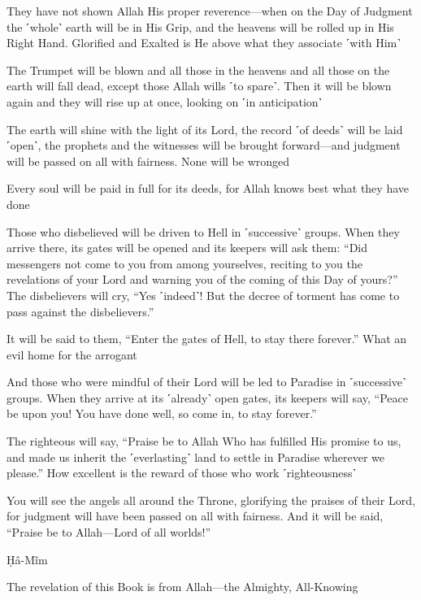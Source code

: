 They have not shown Allah His proper reverence—when on the Day of Judgment the ˹whole˺ earth will be in His Grip, and the heavens will be rolled up in His Right Hand. Glorified and Exalted is He above what they associate ˹with Him˺

The Trumpet will be blown and all those in the heavens and all those on the earth will fall dead, except those Allah wills ˹to spare˺. Then it will be blown again and they will rise up at once, looking on ˹in anticipation˺

The earth will shine with the light of its Lord, the record ˹of deeds˺ will be laid ˹open˺, the prophets and the witnesses will be brought forward—and judgment will be passed on all with fairness. None will be wronged

Every soul will be paid in full for its deeds, for Allah knows best what they have done

Those who disbelieved will be driven to Hell in ˹successive˺ groups. When they arrive there, its gates will be opened and its keepers will ask them: “Did messengers not come to you from among yourselves, reciting to you the revelations of your Lord and warning you of the coming of this Day of yours?” The disbelievers will cry, “Yes ˹indeed˺! But the decree of torment has come to pass against the disbelievers.”

It will be said to them, “Enter the gates of Hell, to stay there forever.” What an evil home for the arrogant

And those who were mindful of their Lord will be led to Paradise in ˹successive˺ groups. When they arrive at its ˹already˺ open gates, its keepers will say, “Peace be upon you! You have done well, so come in, to stay forever.”

The righteous will say, “Praise be to Allah Who has fulfilled His promise to us, and made us inherit the ˹everlasting˺ land to settle in Paradise wherever we please.” How excellent is the reward of those who work ˹righteousness˺

You will see the angels all around the Throne, glorifying the praises of their Lord, for judgment will have been passed on all with fairness. And it will be said, “Praise be to Allah—Lord of all worlds!”

Ḥâ-Mĩm

The revelation of this Book is from Allah—the Almighty, All-Knowing

